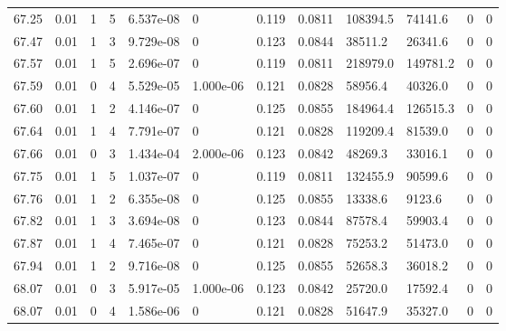 \documentclass[preview]{standalone}
\begin{document}
{{{{{{{{{{{{{{{{{{{\begin{tabular}{L{1.2cm}C{1.2cm} C{0.3cm}C{0.5cm} C{1.4cm}C{1.4cm} C{1.4cm}C{1.4cm} C{1.6cm}C{1.6cm} C{1.6cm}C{1.6cm}}
  67.25  &  0.01  & 1     &  5 &  6.537e-08  & 0  &  0.119&   0.0811& 108394.5 & 74141.6   &  0 & 0  \\ 
  67.47  &  0.01  & 1     &  3 &  9.729e-08  & 0  &  0.123&   0.0844& 38511.2 & 26341.6   &  0 & 0  \\ 
  67.57  &  0.01  & 1     &  5 &  2.696e-07  & 0  &  0.119&   0.0811& 218979.0 & 149781.2   &  0 & 0  \\ 
  67.59  &  0.01  & 0     &  4 &  5.529e-05  & 1.000e-06  &  0.121&   0.0828& 58956.4 & 40326.0   &  0 & 0  \\ 
  67.60  &  0.01  & 1     &  2 &  4.146e-07  & 0  &  0.125&   0.0855& 184964.4 & 126515.3   &  0 & 0  \\ 
  67.64  &  0.01  & 1     &  4 &  7.791e-07  & 0  &  0.121&   0.0828& 119209.4 & 81539.0   &  0 & 0  \\ 
  67.66  &  0.01  & 0     &  3 &  1.434e-04  & 2.000e-06  &  0.123&   0.0842& 48269.3 & 33016.1   &  0 & 0  \\ 
  67.75  &  0.01  & 1     &  5 &  1.037e-07  & 0  &  0.119&   0.0811& 132455.9 & 90599.6   &  0 & 0  \\ 
  67.76  &  0.01  & 1     &  2 &  6.355e-08  & 0  &  0.125&   0.0855& 13338.6 & 9123.6   &  0 & 0  \\ 
  67.82  &  0.01  & 1     &  3 &  3.694e-08  & 0  &  0.123&   0.0844& 87578.4 & 59903.4   &  0 & 0  \\ 
  67.87  &  0.01  & 1     &  4 &  7.465e-07  & 0  &  0.121&   0.0828& 75253.2 & 51473.0   &  0 & 0  \\ 
  67.94  &  0.01  & 1     &  2 &  9.716e-08  & 0  &  0.125&   0.0855& 52658.3 & 36018.2   &  0 & 0  \\ 
  68.07  &  0.01  & 0     &  3 &  5.917e-05  & 1.000e-06  &  0.123&   0.0842& 25720.0 & 17592.4   &  0 & 0  \\ 
  68.07  &  0.01  & 0     &  4 &  1.586e-06  & 0  &  0.121&   0.0828& 51647.9 & 35327.0   &  0 & 0  \\ 
\hline 
\end{tabular} 

}}}}}}}}}}}}}}}}}}}
\end{document}
